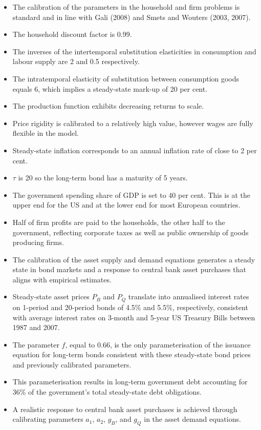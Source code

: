 \documentclass[12pt]{article}
\begin{document}
\begin{itemize}
    \item The calibration of the parameters in the household and firm problems is standard and in line with Gali (2008) and Smets and Wouters (2003, 2007). %
    \item The household discount factor is 0.99.
    \item The inverses of the intertemporal substitution elasticities in consumption and labour supply are 2 and 0.5 respectively.
    \item The intratemporal elasticity of substitution between consumption goods equals 6, which implies a steady-state mark-up of 20 per cent.
    \item The production function exhibits decreasing returns to scale.
    \item Price rigidity is calibrated to a relatively high value, however wages are fully flexible in the model.
    \item Steady-state inflation corresponds to an annual inflation rate of close to 2 per cent.
    \item $\tau$ is 20 so the long-term bond has a maturity of 5 years.
    \item The government spending share of GDP is set to 40 per cent. This is at the upper end for the US and at the lower end for most European countries.
    \item Half of firm profits are paid to the households, the other half to the government, reflecting corporate taxes as well as public ownership of goods producing firms.
    \item The calibration of the asset supply and demand equations generates a steady state in bond markets and a response to central bank asset purchases that aligns with empirical estimates.
    \item Steady-state asset prices $P_B$ and $P_Q$ translate into annualised interest rates on 1-period and 20-period bonds of 4.5\% and 5.5\%, respectively, consistent with average interest rates on 3-month and 5-year US Treasury Bills between 1987 and 2007.
    \item The parameter $f$, equal to 0.66, is the only parameterisation of the issuance equation for long-term bonds consistent with these steady-state bond prices and previously calibrated parameters.
    \item This parameterisation results in long-term government debt accounting for 36\% of the government's total steady-state debt obligations.
    \item A realistic response to central bank asset purchases is achieved through calibrating parameters $a_1$, $a_2$, $g_B$, and $g_Q$ in the asset demand equations.

\end{itemize}
\end{document}
